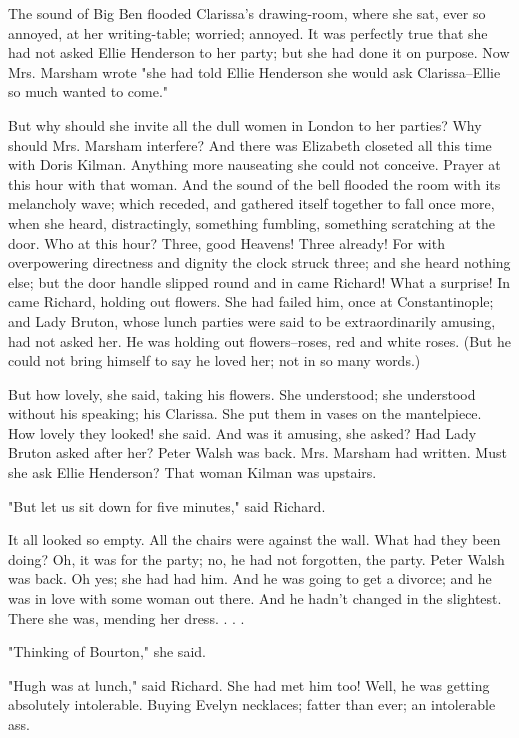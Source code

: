 \documentclass[lang=cn,10pt]{elegantbook}
\begin{document}
The sound of Big Ben flooded Clarissa's drawing-room, where she
sat, ever so annoyed, at her writing-table; worried; annoyed.  It
was perfectly true that she had not asked Ellie Henderson to her
party; but she had done it on purpose.  Now Mrs. Marsham wrote "she
had told Ellie Henderson she would ask Clarissa--Ellie so much
wanted to come."

But why should she invite all the dull women in London to her
parties?  Why should Mrs. Marsham interfere?  And there was
Elizabeth closeted all this time with Doris Kilman.  Anything more
nauseating she could not conceive.  Prayer at this hour with that
woman.  And the sound of the bell flooded the room with its
melancholy wave; which receded, and gathered itself together to
fall once more, when she heard, distractingly, something fumbling,
something scratching at the door.  Who at this hour?  Three, good
Heavens!  Three already!  For with overpowering directness and
dignity the clock struck three; and she heard nothing else; but the
door handle slipped round and in came Richard!  What a surprise!
In came Richard, holding out flowers.  She had failed him, once at
Constantinople; and Lady Bruton, whose lunch parties were said to
be extraordinarily amusing, had not asked her.  He was holding out
flowers--roses, red and white roses.  (But he could not bring
himself to say he loved her; not in so many words.)

But how lovely, she said, taking his flowers.  She understood; she
understood without his speaking; his Clarissa.  She put them in
vases on the mantelpiece.  How lovely they looked! she said.  And
was it amusing, she asked?  Had Lady Bruton asked after her?  Peter
Walsh was back.  Mrs. Marsham had written.  Must she ask Ellie
Henderson?  That woman Kilman was upstairs.

"But let us sit down for five minutes," said Richard.

It all looked so empty.  All the chairs were against the wall.
What had they been doing?  Oh, it was for the party; no, he had not
forgotten, the party.  Peter Walsh was back.  Oh yes; she had had
him.  And he was going to get a divorce; and he was in love with
some woman out there.  And he hadn't changed in the slightest.
There she was, mending her dress. . . .

"Thinking of Bourton," she said.

"Hugh was at lunch," said Richard.  She had met him too!  Well, he
was getting absolutely intolerable.  Buying Evelyn necklaces;
fatter than ever; an intolerable ass.
\end{document}
